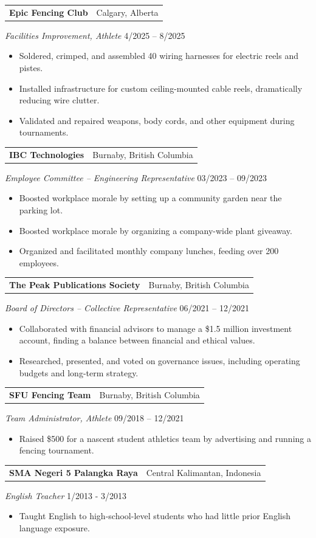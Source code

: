 \documentclass[a4paper,10pt]{article}
\makeatletter
\newcommand{\leadership}[5]{
	{
		\vspace{1.5mm}
		\noindent
		\begin{tabular*}{\textwidth}{@{\extracolsep{\fill}} l r}
			\textbf{#1} & #2 \\
		\end{tabular*}
		
		\noindent\textit{#3} \hfill #4 \\
		\vspace{-5mm}
		\begin{itemize}
			
			\setlength{\itemsep}{-1mm}   %
			\setlength{\topsep}{-4mm}
			\setlength{\parsep}{0mm}
			#5
		\end{itemize}
	}
}
\makeatother
\begin{document}
	\leadership
	{Epic Fencing Club}
	{Calgary, Alberta}
	{Facilities Improvement, Athlete}
	{4/2025 – 8/2025}
	{
		\item Soldered, crimped, and assembled 40 wiring harnesses for electric reels and pistes.
		\item Installed infrastructure for custom ceiling-mounted cable reels, dramatically reducing wire clutter.
		\item Validated and repaired weapons, body cords, and other equipment during tournaments.
	}
%	
	
	\leadership
	{IBC Technologies}                             
	{Burnaby, British Columbia}                  
	{Employee Committee – Engineering Representative}  
	{03/2023 – 09/2023}                          
	{                                            
		\item Boosted workplace morale by setting up a community garden near the parking lot.
		\item Boosted workplace morale by organizing a company-wide plant giveaway.
		\item Organized and facilitated monthly company lunches, feeding over 200 employees.
	}
	
	\leadership
	{The Peak Publications Society}
	{Burnaby, British Columbia}
	{Board of Directors – Collective Representative}
	{06/2021 – 12/2021}
	{
		\item Collaborated with financial advisors to manage a \$1.5 million investment account, finding a balance between financial and ethical values.
		\item Researched, presented, and voted on governance issues, including operating budgets and long-term strategy.
	}

	\leadership
	{SFU Fencing Team}
	{Burnaby, British Columbia}
	{Team Administrator, Athlete}
	{09/2018 – 12/2021}
	{
		\item Raised \$500 for a nascent student athletics team by advertising and running a fencing tournament.	
	}
	
	\leadership
	{SMA Negeri 5 Palangka Raya}
	{Central Kalimantan, Indonesia}
	{English Teacher}
	{1/2013 - 3/2013}
	{
		\item Taught English to high-school-level students who had little prior English language exposure.
	}

%	
\end{document}
